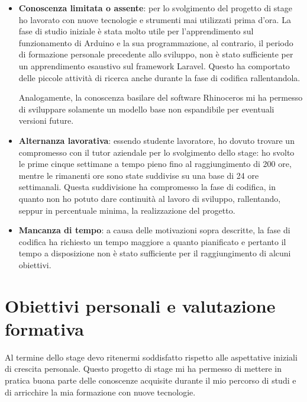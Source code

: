 \begin{itemize}
\item \textbf{Conoscenza limitata o assente}: per lo svolgimento del progetto di stage ho lavorato con nuove tecnologie e strumenti mai utilizzati prima d'ora. La fase di studio iniziale è stata molto utile per l'apprendimento sul funzionamento di Arduino e la sua programmazione, al contrario, il periodo di formazione personale precedente allo sviluppo, non è stato sufficiente per un apprendimento esaustivo sul framework Laravel. Questo ha comportato delle piccole attività di ricerca anche durante la fase di codifica rallentandola.

Analogamente, la conoscenza basilare del software Rhinoceros mi ha permesso di sviluppare solamente un modello base non espandibile per eventuali versioni future.
\item \textbf{Alternanza lavorativa}: essendo studente lavoratore, ho dovuto trovare un compromesso con il tutor aziendale per lo svolgimento dello stage: ho svolto le prime cinque settimane a tempo pieno fino al raggiungimento di 200 ore, mentre le rimanenti ore sono state suddivise su una base di 24 ore settimanali. Questa suddivisione ha compromesso la fase di codifica, in quanto non ho potuto dare continuità al lavoro di sviluppo, rallentando, seppur in percentuale minima, la realizzazione del progetto.
\item \textbf{Mancanza di tempo}: a causa delle motivazioni sopra descritte, la fase di codifica ha richiesto un tempo maggiore a quanto pianificato e pertanto il tempo a disposizione non è stato sufficiente per il raggiungimento di alcuni obiettivi.
\end{itemize}

\section{Obiettivi personali e valutazione formativa}
Al termine dello stage devo ritenermi soddisfatto rispetto alle aspettative iniziali di crescita personale. Questo progetto di stage mi ha permesso di mettere in pratica buona parte delle conoscenze acquisite durante il mio percorso di studi e di arricchire la mia formazione con nuove tecnologie.

